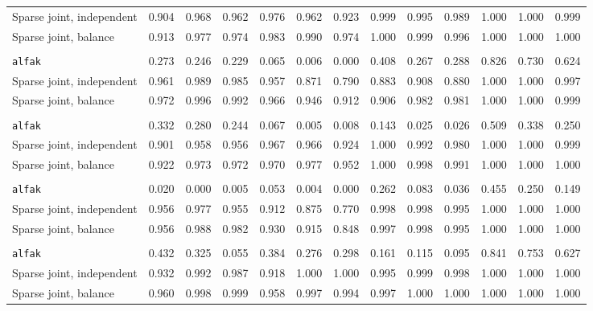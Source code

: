 \begin{center}
\begin{tabular}{l*{12}{r}}
\quad Sparse joint, independent & 0.904 & 0.968 & 0.962 & 0.976 & 0.962 & 0.923 & 0.999 & 0.995 & 0.989 & 1.000 & 1.000 & 0.999 \\
\quad Sparse joint, balance & 0.913 & 0.977 & 0.974 & 0.983 & 0.990 & 0.974 & 1.000 & 0.999 & 0.996 & 1.000 & 1.000 & 1.000 \\
\addlinespace[2pt]
\multicolumn{13}{l}{\textit{500/700, 1080 d}} \\
\quad \texttt{alfak} & 0.273 & 0.246 & 0.229 & 0.065 & 0.006 & 0.000 & 0.408 & 0.267 & 0.288 & 0.826 & 0.730 & 0.624 \\
\quad Sparse joint, independent & 0.961 & 0.989 & 0.985 & 0.957 & 0.871 & 0.790 & 0.883 & 0.908 & 0.880 & 1.000 & 1.000 & 0.997 \\
\quad Sparse joint, balance & 0.972 & 0.996 & 0.992 & 0.966 & 0.946 & 0.912 & 0.906 & 0.982 & 0.981 & 1.000 & 1.000 & 0.999 \\
\addlinespace[2pt]
\multicolumn{13}{l}{\textit{500/700, bottleneck}} \\
\quad \texttt{alfak} & 0.332 & 0.280 & 0.244 & 0.067 & 0.005 & 0.008 & 0.143 & 0.025 & 0.026 & 0.509 & 0.338 & 0.250 \\
\quad Sparse joint, independent & 0.901 & 0.958 & 0.956 & 0.967 & 0.966 & 0.924 & 1.000 & 0.992 & 0.980 & 1.000 & 1.000 & 0.999 \\
\quad Sparse joint, balance & 0.922 & 0.973 & 0.972 & 0.970 & 0.977 & 0.952 & 1.000 & 0.998 & 0.991 & 1.000 & 1.000 & 1.000 \\
\addlinespace[2pt]
\multicolumn{13}{l}{\textit{100/3000, 360 d}} \\
\quad \texttt{alfak} & 0.020 & 0.000 & 0.005 & 0.053 & 0.004 & 0.000 & 0.262 & 0.083 & 0.036 & 0.455 & 0.250 & 0.149 \\
\quad Sparse joint, independent & 0.956 & 0.977 & 0.955 & 0.912 & 0.875 & 0.770 & 0.998 & 0.998 & 0.995 & 1.000 & 1.000 & 1.000 \\
\quad Sparse joint, balance & 0.956 & 0.988 & 0.982 & 0.930 & 0.915 & 0.848 & 0.997 & 0.998 & 0.995 & 1.000 & 1.000 & 1.000 \\
\addlinespace[2pt]
\multicolumn{13}{l}{\textit{3000/100, 360 d}} \\
\quad \texttt{alfak} & 0.432 & 0.325 & 0.055 & 0.384 & 0.276 & 0.298 & 0.161 & 0.115 & 0.095 & 0.841 & 0.753 & 0.627 \\
\quad Sparse joint, independent & 0.932 & 0.992 & 0.987 & 0.918 & 1.000 & 1.000 & 0.995 & 0.999 & 0.998 & 1.000 & 1.000 & 1.000 \\
\quad Sparse joint, balance & 0.960 & 0.998 & 0.999 & 0.958 & 0.997 & 0.994 & 0.997 & 1.000 & 1.000 & 1.000 & 1.000 & 1.000 \\
\bottomrule
\end{tabular}
\end{center}
